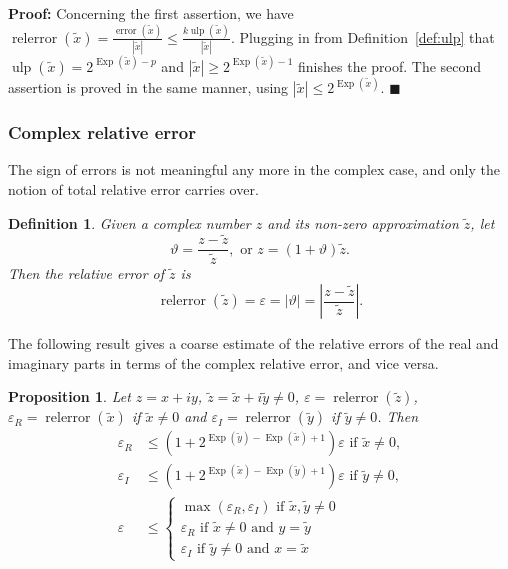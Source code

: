 \documentclass [11pt]{article}
\newcommand {\corr}[1]{{#1}}
\newcommand {\appro}[1]{\widetilde {#1}}
\newcommand {\Ulp}{{\operatorname {ulp}}}
\DeclareMathOperator{\Exp}{\operatorname {Exp}}
\newcommand{\error}{\operatorname {error}}
\newcommand{\relerror}{\operatorname {relerror}}
\renewcommand {\epsilon}{\varepsilon}
\renewcommand {\theta}{\vartheta}
\renewcommand {\leq}{\leqslant}
\renewcommand {\geq}{\geqslant}
\newtheorem{definition}[theorem]{Definition}
\newtheorem{prop}[theorem]{Proposition}
\newenvironment{proof}{\noindent \textbf {Proof:}}{{\hspace* {\fill}$\blacksquare$}}
\begin{document}
\begin {proof}
Concerning the first assertion, we have
$
\relerror (\appro x) = \frac {\error (\appro x)}{|\appro x|}
\leq
\frac {k \Ulp (\appro x)}{|\appro x|}.
$
Plugging in from Definition~\ref {def:ulp} that
$\Ulp (\appro x) = 2^{\Exp (\appro x) - p}$ and
$|\appro x| \geq 2^{\Exp (\appro x) - 1}$ finishes the proof.
The second assertion is proved in the same manner, using
$|\appro x| \leq 2^{\Exp (\appro x)}$.
\end {proof}


\subsubsection {Complex relative error}
\label {sssec:comrelerror}

The sign of errors is not meaningful any more in the complex case, and
only the notion of total relative error carries over.

\begin {definition}
\label {def:comrelerror}
Given a complex number $\corr z$ and its non-zero approximation
$\appro z$, let
\[
\theta = \frac {\corr z - \appro z}{\appro z},
\text { or }
\corr z = (1 + \theta) \appro z.
\]
Then the {\em relative error} of $\appro z$ is
\[
\relerror (\appro z) = \epsilon = | \theta |
= \left| \frac {\corr z - \appro z}{\appro z} \right|.
\]
\end {definition}

The following result gives a coarse
estimate of the relative errors of the real and imaginary parts in terms of
the complex relative error, and vice versa.

\begin {prop}
\label {prop:comrelerror}
Let $\corr z = \corr x + i \corr y$,
$\appro z = \appro x + i \appro y \neq 0$,
$\epsilon = \relerror (\appro z)$,
$\epsilon_R = \relerror (\appro x)$ if $\appro x \neq 0$ and
$\epsilon_I = \relerror (\appro y)$ if $\appro y \neq 0$. Then
\begin {align*}
\epsilon_R
&\leq \left( 1 + 2^{\Exp (\appro y) - \Exp (\appro x) + 1} \right) \epsilon
\text { if } \appro x \neq 0, \\
\epsilon_I
&\leq \left( 1 + 2^{\Exp (\appro x) - \Exp (\appro y) + 1} \right) \epsilon
\text { if } \appro y \neq 0, \\
\epsilon
&\leq \left\{
\begin {array}{l}
\max \left( \epsilon_R, \epsilon_I \right)
\text { if } \appro x, \appro y \neq 0 \\
\epsilon_R \text { if } \appro x \neq 0 \text { and } \corr y = \appro y \\
\epsilon_I \text { if } \appro y \neq 0 \text { and } \corr x = \appro x
\end {array}
\right.
\end {align*}
\end {prop}
\end{document}
